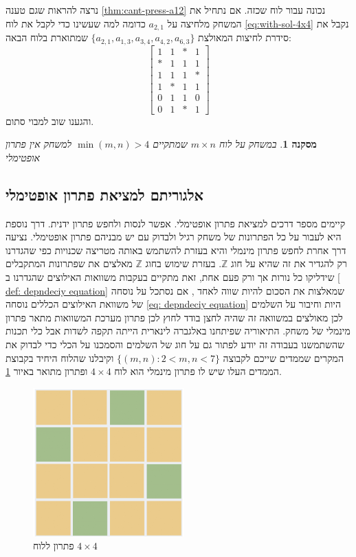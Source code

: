 \documentclass[12pt,leqno]{article}
\theoremstyle{theoremdd}
\newtheorem{corollary}{מסקנה}[section]
\begin{document}
נרצה להראות שגם טענה 
\ref{thm:cant-press-a12}
נכונה עבור לוח שכזה.
אם 
נתחיל את המשחק 
מלחיצה על 
$a_{2,1}$
כדומה למה שעשינו כדי לקבל את לוח 
\ref{eq:with-sol-4x4}
נקבל את סידרת לחיצות המאולצת
$\{a_{2,1}, a_{1,3}, a_{3,4}, a_{4,2}, a_{6,3}\}$
שמתוארת בלוח הבאה:
\[
    \begin{bmatrix}
        1 & 1 & * & 1\\
        * & 1 & 1 & 1\\
        1 & 1 & 1 & *\\
        1 & * & 1 & 1\\
        0 & 1 & 1 & 0\\
        0 & 1 & * & 1
    \end{bmatrix}
\]
והגענו שוב למבוי סתום.
\begin{corollary}
    \label{thrm: bigger then 7x7 board no minimal solution}
    במשחק על לוח 
    $m \times n$
    שמתקיים
    $\min(m,n) > 4$
    למשחק אין פתרון אופטימלי
\end{corollary}

\subsection{אלגוריתם למציאת פתרון אופטימלי}
קיימים מספר דרכים למציאת פתרון אופטימלי.
אפשר לנסות ולחפש פתרון ידנית.
דרך נוספת היא לעבור על כל הפתרונות של משחק רגיל ולבדוק עם יש מבניהם פתרון 
אופטימלי.
נציעה דרך אחרת לחפש פתרון 
מינמלי
והיא בעזרת להשתמש באותה מטריצה שכנויות כפי שהגדרנו רק להגדיר 
את זה שהיא על חוג 
$\mathbb{Z}$.
בעזרת שימוש בחוג 
$\mathbb{Z}$
מאלצים את שפתרונות המתקבלים
שידליקו כל נורות אך ורק פעם אחת,
זאת מתקיים בעקבות 
משוואות האילוצים שהגדרנו ב
\ref{ def: depndeciy equation}
שמאלצות את הסכום להיות שווה לאחד
,
אם נסתכל על נוסחה של משוואת האילוצים הכללים 
נוסחה
\ref{eq: depndeciy equation}
היות וחיבור על השלמים לכן 
מאולצים במשוואה זה שהיה לחצן בודד לחוץ 
לכן פתרון מערכת המשוואות מתאר פתרון 
מינמלי של משחק.
התיאוריה שפיתחנו באלגברה לינארית הייתה תקפה לשדות 
אבל כלי תכנות שהשתמשנו
בעבודה זה יודע לפתור גם על חוג של השלמים 
והסמכנו על הכלי כדי לבדוק את המקרים
שממדים שייכם לקבוצה 
$\{ (m,n) : 2 < m,n <7 \}$
וקיבלנו שהלוח
היחיד בקבוצת הממדים העלו שיש לו פתרון מינמלי 
הוא
לוח 
$4 \times 4$
ופתרון מתואר באיור 
\ref{fig:4x4_have_min_sol}.

\begin{figure}[ht]
    \caption{פתרון ללוח 
    $4 \times 4$}
    \label{fig:4x4_have_min_sol}
    \centering
    \includegraphics[width=.3\textwidth,keepaspectratio]{images/4x4_sol.PNG}
\end{figure}
\end{document}
